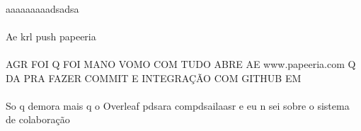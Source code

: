 \documentclass[12pt]{article}
\begin{document}
\paragraph{}aaaaaaaaadsadsa
\paragraph{}Ae krl push papeeria
\paragraph{}AGR FOI Q FOI MANO VOMO COM TUDO ABRE AE www.papeeria.com Q DA PRA FAZER COMMIT E INTEGRAÇÃO COM GITHUB EM
\paragraph{}So q demora mais q o Overleaf pdsara compdsailaasr e eu n sei sobre o sistema de colaboração
\end{document}
